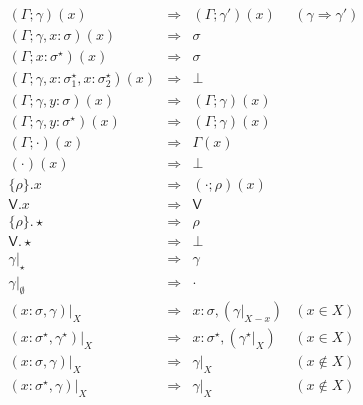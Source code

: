 \documentclass[10pt,a4paper]{article}
\newcommand\y[1]{\ensuremath{\mathsf{#1}}\xspace}
\begin{document}
$$
\begin{array}{lcll}
(\Gamma;\gamma)(x) &\Rightarrow& (\Gamma;\gamma')(x) & (\gamma \Rightarrow \gamma') \\
(\Gamma;\gamma,x{:}\sigma)(x) &\Rightarrow& \sigma \\
(\Gamma;x{:}\sigma^\star)(x) &\Rightarrow& \sigma \\
(\Gamma;\gamma,x{:}\sigma_1^\star,x{:}\sigma_2^\star)(x) &\Rightarrow& \bot \\
(\Gamma;\gamma,y{:}\sigma)(x) &\Rightarrow& (\Gamma;\gamma)(x) \\
(\Gamma;\gamma,y{:}\sigma^\star)(x) &\Rightarrow& (\Gamma;\gamma)(x) \\
(\Gamma;\cdot)(x) &\Rightarrow& \Gamma(x) \\
(\cdot)(x) &\Rightarrow& \bot \\
[1ex]
\{\rho\}.x &\Rightarrow& (\cdot;\rho)(x) \\
\y{V}.x &\Rightarrow& \y{V} \\
[1ex]
\{\rho\}.{\star} &\Rightarrow& \rho \\
\y{V}.{\star} &\Rightarrow& \bot \\
[1ex]
\gamma|_\star &\Rightarrow& \gamma \\
\gamma|_\emptyset &\Rightarrow& \cdot \\
(x{:}\sigma,\gamma)|_X &\Rightarrow& x{:}\sigma,(\gamma|_{X-x}) & (x \in X) \\
(x{:}\sigma^\star,\gamma^\star)|_X &\Rightarrow& x{:}\sigma^\star,(\gamma^\star|_X) & (x \in X) \\
(x{:}\sigma,\gamma)|_X &\Rightarrow& \gamma|_X & (x \notin X) \\
(x{:}\sigma^\star,\gamma)|_X &\Rightarrow& \gamma|_X & (x \notin X) \\
[1ex]

\end{array}$$
\end{document}
